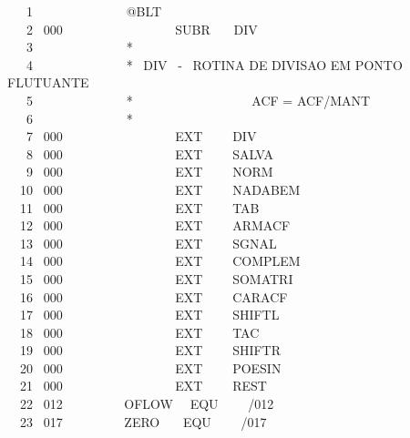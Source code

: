 \documentclass[a4paper,12pt]{article}
\begin{document}
\noindent \ \ \ 1 \ \ \ \ \ \ \ \ \ \ \ \ \ \ @BLT\\ 
\phantom \ \ \ 2 \ 000 \ \ \ \ \ \ \ \ \ \ \ \ \ \ \ \ \ SUBR \ \ \ DIV\\
\phantom \ \ \ 3 \ \ \ \ \ \ \ \ \ \ \ \ \ \ *\\
\phantom \ \ \ 4 \ \ \ \ \ \ \ \ \ \ \ \ \ \ * \ DIV \ - \ ROTINA DE DIVISAO EM PONTO FLUTUANTE\\
\phantom \ \ \ 5 \ \ \ \ \ \ \ \ \ \ \ \ \ \ * \ \ \ \ \ \ \ \ \ \ \ \ \ \ \ \ \ \ ACF = ACF/MANT\\
\phantom \ \ \ 6 \ \ \ \ \ \ \ \ \ \ \ \ \ \ *\\
\phantom \ \ \ 7 \ 000 \ \ \ \ \ \ \ \ \ \ \ \ \ \ \ \ \ EXT \ \ \ \ DIV\\
\phantom \ \ \ 8 \ 000 \ \ \ \ \ \ \ \ \ \ \ \ \ \ \ \ \ EXT \ \ \ \ SALVA\\
\phantom \ \ \ 9 \ 000 \ \ \ \ \ \ \ \ \ \ \ \ \ \ \ \ \ EXT \ \ \ \ NORM\\
\phantom \ \ 10 \ 000 \ \ \ \ \ \ \ \ \ \ \ \ \ \ \ \ \ EXT \ \ \ \ NADABEM\\
\phantom \ \ 11 \ 000 \ \ \ \ \ \ \ \ \ \ \ \ \ \ \ \ \ EXT \ \ \ \ TAB\\
\phantom \ \ 12 \ 000 \ \ \ \ \ \ \ \ \ \ \ \ \ \ \ \ \ EXT \ \ \ \ ARMACF\\
\phantom \ \ 13 \ 000 \ \ \ \ \ \ \ \ \ \ \ \ \ \ \ \ \ EXT \ \ \ \ SGNAL\\
\phantom \ \ 14 \ 000 \ \ \ \ \ \ \ \ \ \ \ \ \ \ \ \ \ EXT \ \ \ \ COMPLEM\\
\phantom \ \ 15 \ 000 \ \ \ \ \ \ \ \ \ \ \ \ \ \ \ \ \ EXT \ \ \ \ SOMATRI\\
\phantom \ \ 16 \ 000 \ \ \ \ \ \ \ \ \ \ \ \ \ \ \ \ \ EXT \ \ \ \ CARACF\\
\phantom \ \ 17 \ 000 \ \ \ \ \ \ \ \ \ \ \ \ \ \ \ \ \ EXT \ \ \ \ SHIFTL\\
\phantom \ \ 18 \ 000 \ \ \ \ \ \ \ \ \ \ \ \ \ \ \ \ \ EXT \ \ \ \ TAC\\
\phantom \ \ 19 \ 000 \ \ \ \ \ \ \ \ \ \ \ \ \ \ \ \ \ EXT \ \ \ \ SHIFTR\\
\phantom \ \ 20 \ 000 \ \ \ \ \ \ \ \ \ \ \ \ \ \ \ \ \ EXT \ \ \ \ POESIN\\
\phantom \ \ 21 \ 000 \ \ \ \ \ \ \ \ \ \ \ \ \ \ \ \ \ EXT \ \ \ \ REST\\
\phantom \ \ 22 \ 012 \ \ \ \ \ \ \ \ \ OFLOW \ \ EQU \ \ \ \ /012\\
\phantom \ \ 23 \ 017 \ \ \ \ \ \ \ \ \ ZERO \ \ \ EQU \ \ \ \ /017\\
\end{document}

